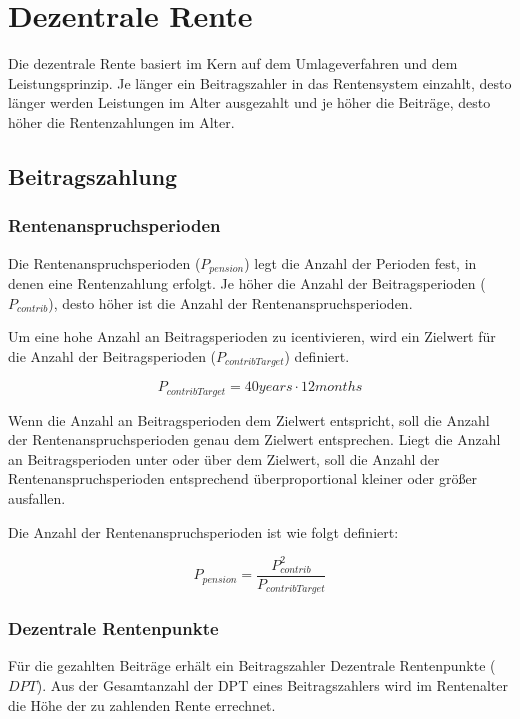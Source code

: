 \section{Dezentrale Rente}

Die dezentrale Rente basiert im Kern auf dem Umlageverfahren und dem
Leistungsprinzip. Je länger ein Beitragszahler in das Rentensystem einzahlt, 
desto länger werden Leistungen im Alter ausgezahlt und je höher die Beiträge,
desto höher die Rentenzahlungen im Alter.

\subsection{Beitragszahlung}

\subsubsection*{Rentenanspruchsperioden}

Die Rentenanspruchsperioden ($P_{pension}$) legt die Anzahl der Perioden fest,
in denen eine Rentenzahlung erfolgt. Je höher die Anzahl der Beitragsperioden
($P_{contrib}$), desto höher ist die Anzahl der Rentenanspruchsperioden.

Um eine hohe Anzahl an Beitragsperioden zu icentivieren, wird ein Zielwert 
für die Anzahl der Beitragsperioden ($P_{contribTarget}$) definiert. 

\begin{equation}
	P_{contribTarget} = 40 years \cdot 12 months
\end{equation}

Wenn die Anzahl an Beitragsperioden dem Zielwert entspricht, soll die Anzahl der 
Rentenanspruchsperioden genau dem Zielwert entsprechen. Liegt die  Anzahl an
Beitragsperioden unter oder über dem Zielwert, soll die Anzahl der 
Rentenanspruchsperioden entsprechend überproportional kleiner oder größer ausfallen.  

Die Anzahl der Rentenanspruchsperioden ist wie folgt definiert:

\begin{equation}
	P_{pension} = \frac{P_{contrib}^2}{P_{contribTarget}}
\end{equation}


\subsubsection*{Dezentrale Rentenpunkte}
Für die gezahlten Beiträge erhält ein Beitragszahler Dezentrale Rentenpunkte
($DPT$). Aus der Gesamtanzahl der DPT eines Beitragszahlers wird im Rentenalter
die Höhe der zu zahlenden Rente errechnet.

